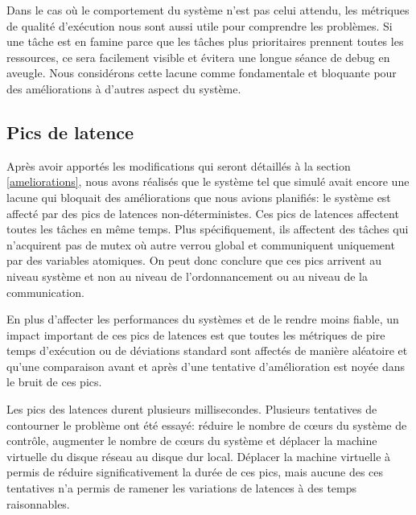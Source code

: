 \documentclass[journal]{IEEEtran}
\begin{document}
Dans le cas où le comportement du système n'est pas celui attendu, les métriques de qualité d'exécution nous sont aussi utile pour comprendre les problèmes. Si une tâche est en famine parce que les tâches plus prioritaires prennent toutes les ressources, ce sera facilement visible et évitera une longue séance de debug en aveugle. Nous considérons cette lacune comme fondamentale et bloquante pour des améliorations à d'autres aspect du système.

\subsection{Pics de latence}

Après avoir apportés les modifications qui seront détaillés à la section \ref{ameliorations}, nous avons réalisés que le système tel que simulé avait encore une lacune qui bloquait des améliorations que nous avions planifiés: le système est affecté par des pics de latences non-déterministes. Ces pics de latences affectent toutes les tâches en même temps. Plus spécifiquement, ils affectent des tâches qui n'acquirent pas de mutex où autre verrou global et communiquent uniquement par des variables atomiques. On peut donc conclure que ces pics arrivent au niveau système et non au niveau de l'ordonnancement ou au niveau de la communication. 

En plus d'affecter les performances du systèmes et de le rendre moins fiable, un impact important de ces pics de latences est que toutes les métriques de pire temps d'exécution ou de déviations standard sont affectés de manière aléatoire et qu'une comparaison avant et après d'une tentative d'amélioration est noyée dans le bruit de ces pics.

Les pics des latences durent plusieurs millisecondes. Plusieurs tentatives de contourner le problème ont été essayé: réduire le nombre de cœurs du système de contrôle, augmenter le nombre de cœurs du système et déplacer la machine virtuelle du disque réseau au disque dur local. Déplacer la machine virtuelle à permis de réduire significativement la durée de ces pics, mais aucune des ces tentatives n'a permis de ramener les variations de latences à des temps raisonnables.
\end{document}
